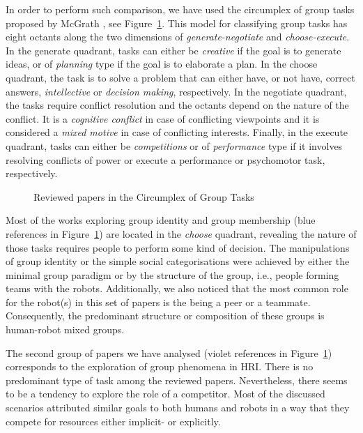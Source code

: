 In order to perform such comparison, we have used the circumplex of group tasks proposed by McGrath \cite{mcgrath1995methodology}, see Figure~\ref{fig:circumplex}. This model for classifying group tasks has eight octants along the two dimensions of \textit{generate-negotiate} and \textit{choose-execute}. In the generate quadrant, tasks can either be \textit{creative} if the goal is to generate ideas, or of \textit{planning} type if the goal is to elaborate a plan. In the choose quadrant, the task is to solve a problem that can either have, or not have, correct answers, \textit{intellective} or \textit{decision making}, respectively. In the negotiate quadrant, the tasks require conflict resolution and the octants depend on the nature of the conflict. It is a \textit{cognitive conflict} in case of conflicting viewpoints and it is considered a \textit{mixed motive} in case of conflicting interests. Finally, in the execute quadrant, tasks can either be \textit{competitions} or of \textit{performance} type if it involves resolving conflicts of power or execute a performance or psychomotor task, respectively.

\begin{figure}
    \centering
    
    \caption{Reviewed papers in the Circumplex of Group Tasks \cite{mcgrath1995methodology}}
    \label{fig:circumplex}
\end{figure}

Most of the works exploring group identity and group membership (blue references in Figure~\ref{fig:circumplex}) are located in the \textit{choose} quadrant, revealing the nature of those tasks requires people to perform some kind of decision. The manipulations of group identity or the simple social categorisations were achieved by either the minimal group paradigm or by the structure of the group, i.e., people forming teams with the robots. Additionally, we also noticed that the most common role for the robot(s) in this set of papers is the being a peer or a teammate. Consequently, the predominant structure or composition of these groups is human-robot mixed groups.

The second group of papers we have analysed (violet references in Figure~\ref{fig:circumplex}) corresponds to the exploration of group phenomena in HRI. There is no predominant type of task among the reviewed papers. Nevertheless, there seems to be a tendency to explore the role of a competitor. Most of the discussed scenarios attributed similar goals to both humans and robots in a way that they compete for resources either implicit- or explicitly.

